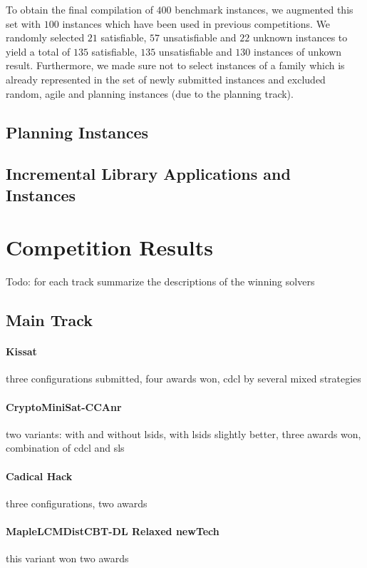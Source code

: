 \documentclass{elsarticle}
\newcommand{\todo}[1]{{\color{purple}Todo: #1}}
\begin{document}
To obtain the final compilation of $400$ benchmark instances, we augmented this set with $100$ instances which have been used in previous competitions. 
We randomly selected $21$ satisfiable, $57$ unsatisfiable and $22$ unknown instances to yield a total of $135$ satisfiable, $135$ unsatisfiable and $130$ instances of unkown result. 
Furthermore, we made sure not to select instances of a family which is already represented in the set of newly submitted instances and excluded random, agile and planning instances (due to the planning track). 


\subsection{Planning Instances}

\subsection{Incremental Library Applications and Instances}


\section{Competition Results}
\label{sec:results}
\todo{for each track summarize the descriptions of the winning solvers}

\subsection{Main Track}

\paragraph{Kissat} 
three configurations submitted, four awards won, cdcl by several mixed strategies

\paragraph{CryptoMiniSat-CCAnr}
two variants: with and without lsids, with lsids slightly better, three awards won,  combination of cdcl and sls

\paragraph{Cadical Hack}
three configurations, two awards

\paragraph{MapleLCMDistCBT-DL Relaxed newTech}
this variant won two awards
\end{document}
